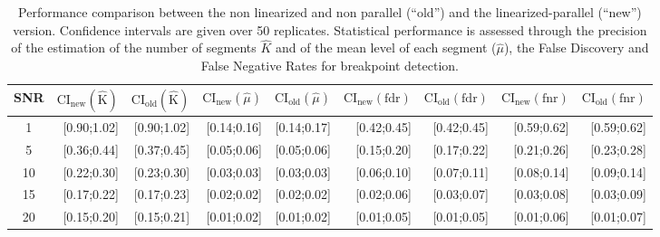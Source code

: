 \documentclass[11pt]{llncs}
\begin{document}
{\begin{table}[ht]
\begin{center}
\begin{small}
\begin{tabular}{|c|rr|rr|rr|rr|}
  \hline
SNR  &  $\text{CI}_{\text{new}}(\widehat{\text{K}})$ & $\text{CI}_{\text{old}}(\widehat{\text{K}})$ & $ \text{CI}_{\text{new}}(\hat{\mu})$ & $\text{CI}_{\text{old}}(\hat{\mu})$ & $\text{CI}_{\text{new}}(\text{fdr})$ & $\text{CI}_{\text{old}}(\text{fdr})$   
     & $\text{CI}_{\text{new}}(\text{fnr})$ & $\text{CI}_{\text{old}}(\text{fnr})$  \\
  \hline
  1   & [0.90;1.02] & [0.90;1.02] & [0.14;0.16] & [0.14;0.17] & [0.42;0.45] & [0.42;0.45] & [0.59;0.62] & [0.59;0.62] \\ 
  5   & [0.36;0.44] & [0.37;0.45] & [0.05;0.06] & [0.05;0.06] & [0.15;0.20] & [0.17;0.22] & [0.21;0.26] & [0.23;0.28] \\ 
  10  & [0.22;0.30] & [0.23;0.30] & [0.03;0.03] & [0.03;0.03] & [0.06;0.10] & [0.07;0.11] & [0.08;0.14] & [0.09;0.14] \\ 
  15  & [0.17;0.22] & [0.17;0.23] & [0.02;0.02] & [0.02;0.02] & [0.02;0.06] & [0.03;0.07] & [0.03;0.08] & [0.03;0.09] \\ 
  20  & [0.15;0.20] & [0.15;0.21] & [0.01;0.02] & [0.01;0.02] & [0.01;0.05] & [0.01;0.05] & [0.01;0.06] & [0.01;0.07] \\ 
   \hline
\end{tabular}
\end{small}
\end{center}
\caption{Performance comparison between the non linearized and non parallel (``old'') and the linearized-parallel (``new'') version. Confidence intervals are given over 50 replicates. Statistical performance is assessed through the precision of the estimation of the number of segments $\hat{K}$ and of the mean level of each segment ($\hat{\mu}$), the False Discovery and False Negative Rates for breakpoint detection.\label{Tab:stat}} 
\end{table}

}
\end{document}
